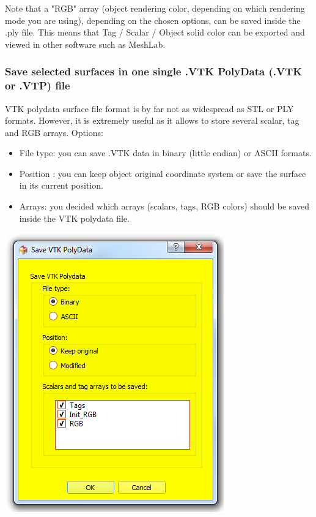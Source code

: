 Note that a "RGB" array (object rendering color, depending on which rendering mode you
are using), depending on the chosen options, can be saved inside the .ply file. This means that Tag / Scalar / Object solid color can be exported and viewed in other software such as MeshLab.


\subsubsection{Save selected surfaces in one single .VTK PolyData (.VTK or .VTP) file}
\begin{minipage}{0.5\textwidth}
VTK polydata surface file format is by far not as widespread as STL or PLY
formats. However, it is extremely useful as it allows to store several
scalar, tag and RGB arrays.
Options:
\begin{itemize}
\item File type: you can save .VTK data in binary (little endian) or
ASCII formats.
\item Position : you can keep object original coordinate system
or save the surface in its current position.
\item Arrays: you decided which arrays (scalars, tags, RGB colors) should be saved inside the VTK polydata file.
\end{itemize}
\end{minipage}    
\begin{minipage}{0.5\textwidth}\centering
  \includegraphics[scale=0.5]{images/07/surface/save_vtk.png}
 \end{minipage} 
\noindent


